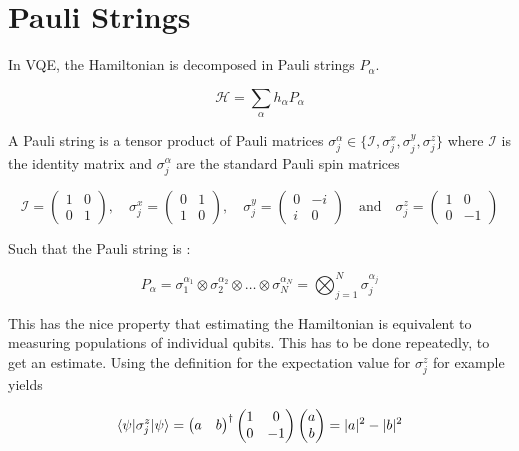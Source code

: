 \chapter{Pauli Strings}\label{ch:PauliExpectation}

In VQE, the Hamiltonian is decomposed in Pauli strings $P_{\alpha}$.

\begin{equation}
	\mathcal{H} = \sum_{\alpha} h_{\alpha} P_{\alpha}
\end{equation}


A Pauli string is a tensor product of Pauli matrices $\sigma_j^{\alpha} \in \{\mathcal{I}, \sigma_j^x, \sigma_j^y, \sigma_j^z\}$ where $\mathcal{I}$ is the identity matrix and $\sigma_j^{\alpha}$ are the standard Pauli spin matrices \cite{Griffiths2004}

\begin{equation}
	\mathcal{I} =
	 \begin{pmatrix}
		1 & 0\\
		0 & 1
	\end{pmatrix},
	 \quad \sigma_j^x=
	\begin{pmatrix}
		0 & 1\\
		1 & 0
	\end{pmatrix},
	\quad \sigma_j^y=
	\begin{pmatrix}
		0 & -i\\
		i & 0
	\end{pmatrix} 
	\quad \text{and}
	\quad \sigma_j^z = 
	\begin{pmatrix}
		1 & 0\\
		0 & -1
	\end{pmatrix}
\end{equation}

Such that the Pauli string is \cite{Moll2018}:

\begin{equation}\label{eq:PauliString}
	P_{\alpha} = 
	\sigma_1^{\alpha_1} \otimes \sigma_2^{\alpha_2} \otimes \ldots \otimes \sigma_N^{\alpha_N} = 
	\bigotimes_{j=1}^N \sigma_j^{\alpha_j}
\end{equation}

This has the nice property that estimating the Hamiltonian is equivalent to measuring populations of individual qubits. This has to be done repeatedly, to get an estimate. Using the definition for the expectation value for $\sigma_j^z$ for example yields

\begin{equation}\label{eq:ExpectationValue}
	\langle\psi\rvert  \sigma_j^z  \lvert\psi\rangle = 
	\begin{pmatrix}
		a & b
	\end{pmatrix}^{\dag}
	\begin{pmatrix}
		1 & 0\\
		0 & -1
	\end{pmatrix}
	\begin{pmatrix}
		a \\ b
	\end{pmatrix}=
	|a|^2-|b|^2
\end{equation}

